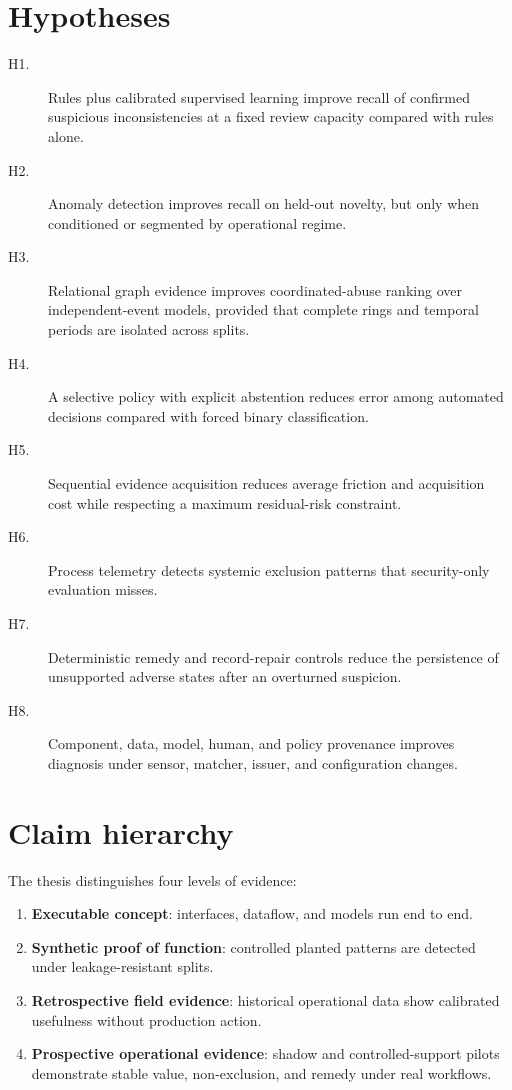 \section{Hypotheses}

\begin{description}
\item[H1.] Rules plus calibrated supervised learning improve recall of confirmed suspicious inconsistencies at a fixed review capacity compared with rules alone.
\item[H2.] Anomaly detection improves recall on held-out novelty, but only when conditioned or segmented by operational regime.
\item[H3.] Relational graph evidence improves coordinated-abuse ranking over independent-event models, provided that complete rings and temporal periods are isolated across splits.
\item[H4.] A selective policy with explicit abstention reduces error among automated decisions compared with forced binary classification.
\item[H5.] Sequential evidence acquisition reduces average friction and acquisition cost while respecting a maximum residual-risk constraint.
\item[H6.] Process telemetry detects systemic exclusion patterns that security-only evaluation misses.
\item[H7.] Deterministic remedy and record-repair controls reduce the persistence of unsupported adverse states after an overturned suspicion.
\item[H8.] Component, data, model, human, and policy provenance improves diagnosis under sensor, matcher, issuer, and configuration changes.
\end{description}

\section{Claim hierarchy}

The thesis distinguishes four levels of evidence:

\begin{enumerate}
\item \textbf{Executable concept}: interfaces, dataflow, and models run end to end.
\item \textbf{Synthetic proof of function}: controlled planted patterns are detected under leakage-resistant splits.
\item \textbf{Retrospective field evidence}: historical operational data show calibrated usefulness without production action.
\item \textbf{Prospective operational evidence}: shadow and controlled-support pilots demonstrate stable value, non-exclusion, and remedy under real workflows.
\end{enumerate}

